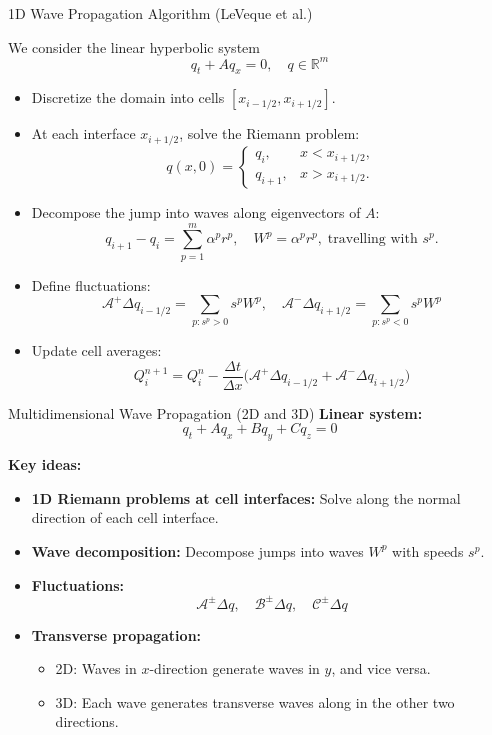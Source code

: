 


\begin{frame}{1D Wave Propagation Algorithm (LeVeque et al.)}
	\scriptsize
	
	We consider the linear hyperbolic system
	\[
	q_t + Aq_x = 0, \quad q \in \mathbb{R}^m
	\]
	
	\begin{itemize}
		\item Discretize the domain into cells $[x_{i-1/2}, x_{i+1/2}]$.
		\item At each interface $x_{i+1/2}$, solve the Riemann problem:
		\[
		q(x,0) = 
		\begin{cases} 
			q_i, & x < x_{i+1/2}, \\ 
			q_{i+1}, & x > x_{i+1/2}.
		\end{cases}
		\]
		\item Decompose the jump into waves along eigenvectors of $A$:
		\[
		q_{i+1} - q_i = \sum_{p=1}^m \alpha^p r^p, 
		\quad W^p = \alpha^p r^p, \; \text{travelling with } s^p.
		\]
		\pause
		\item Define fluctuations:
		\[
		\mathcal{A}^+ \Delta q_{i-1/2} = \sum_{p: s^p>0} s^p W^p, \quad
		\mathcal{A}^- \Delta q_{i+1/2} = \sum_{p: s^p<0} s^p W^p
		\]
		\item Update cell averages:
		\[
		Q_i^{n+1} = Q_i^n - \frac{\Delta t}{\Delta x} 
		\Big( \mathcal{A}^+ \Delta q_{i-1/2} + \mathcal{A}^- \Delta q_{i+1/2} \Big)
		\]
	\end{itemize}
\end{frame}




\begin{frame}{Multidimensional Wave Propagation (2D and 3D)}
	\scriptsize
	\textbf{Linear system:}
			\[
			q_t + Aq_x + Bq_y + Cq_z = 0
			\]
			
			\textbf{Key ideas:}
			\begin{itemize}
				\item \textbf{1D Riemann problems at cell interfaces:}  
				Solve along the normal direction of each cell interface.
				\item \textbf{Wave decomposition:}  
				Decompose jumps into waves \(W^p\) with speeds \(s^p\).
				\item \textbf{Fluctuations:}  
				\[
				\mathcal{A}^\pm \Delta q, \quad 
				\mathcal{B}^\pm \Delta q, \quad 
				\mathcal{C}^\pm \Delta q
				\]
				\pause
				\item \textbf{Transverse propagation:}  
				\begin{itemize}
					\item 2D: Waves in \(x\)-direction generate waves in \(y\), and vice versa.
					\item 3D: Each wave generates transverse waves along in the other two directions.
				\end{itemize}
			\end{itemize}
\end{frame}


